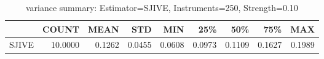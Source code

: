 \begin{table}[ht]
\centering
\caption{variance summary: Estimator=SJIVE, Instruments=250, Strength=0.10}
\begin{tabular}{lrrrrrrrr}
\toprule
 & COUNT & MEAN & STD & MIN & 25\% & 50\% & 75\% & MAX \\
\midrule
SJIVE & 10.0000 & 0.1262 & 0.0455 & 0.0608 & 0.0973 & 0.1109 & 0.1627 & 0.1989 \\
\bottomrule
\end{tabular}
\end{table}
